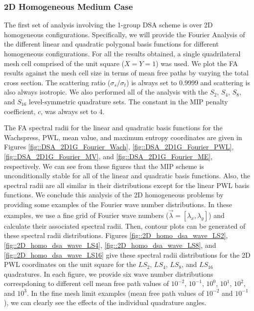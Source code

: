 \subsubsection{2D Homogeneous Medium Case}
\label{sec::DSA_Results_1G_2DHomo}

The first set of analysis involving the 1-group DSA scheme is over 2D homogeneous configurations. Specifically, we will provide the Fourier Analysis of the different linear and quadratic polygonal basis functions for different homogeneous configurations. For all the results obtained, a single quadrilateral mesh cell comprised of the unit square ($X=Y=1$) was used. We plot the FA results against the mesh cell size in terms of mean free paths by varying the total cross section. The scattering ratio ($\sigma_s / \sigma_t$) is always set to 0.9999 and scattering is also always isotropic. We also performed all of the analysis with the $S_2$, $S_4$, $S_8$, and $S_{16}$ level-symmetric quadrature sets. The constant in the MIP penalty coefficient, $c$, was always set to 4.

The FA spectral radii for the linear and quadratic basis functions for the Wachspress, PWL, mean value, and maximum entropy coordinates are given in Figures \ref{fig::DSA_2D1G_Fourier_Wach}, \ref{fig::DSA_2D1G_Fourier_PWL}, \ref{fig::DSA_2D1G_Fourier_MV}, and \ref{fig::DSA_2D1G_Fourier_ME}, respectively. We can see from these figures that the MIP scheme is unconditionally stable for all of the linear and quadratic basis functions. Also, the spectral radii are all similar in their distributions except for the linear PWL basis functions. We conclude this analysis of the 2D homogeneous problems by providing some examples of the Fourier wave number distributions. In these examples, we use a fine grid of Fourier wave numbers ($\vec{\lambda}=[\lambda_x, \lambda_y]$) and calculate their associated spectral radii. Then, contour plots can be generated of these spectral radii distributions. Figures \ref{fig::2D_homo_dsa_wave_LS2}, \ref{fig::2D_homo_dsa_wave_LS4}, \ref{fig::2D_homo_dsa_wave_LS8}, and \ref{fig::2D_homo_dsa_wave_LS16} give these spectral radii distributions for the 2D PWL coordinates on the unit square for the $LS_2$, $LS_4$, $LS_8$, and $LS_{16}$ quadratures. In each figure, we provide six wave number distributions correspdoning to different cell mean free path values of $10^{-2}$, $10^{-1}$, $10^0$, $10^1$, $10^2$, and $10^3$. In the fine mesh limit examples (mean free path values of $10^{-2}$ and $10^{-1}$), we can clearly see the effects of the individual quadrature angles.

